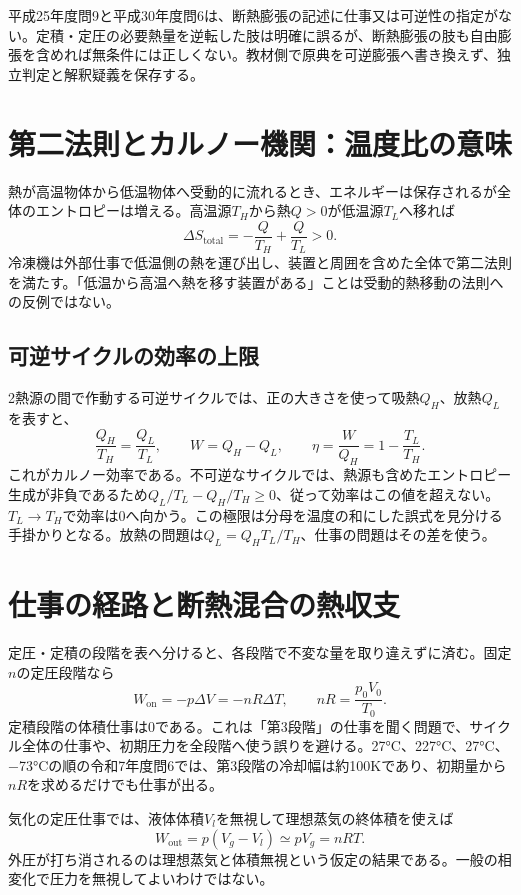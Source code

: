 \begin{tcolorbox}[title=原典の限定不足を保持する]
平成25年度問9と平成30年度問6は、断熱膨張の記述に仕事又は可逆性の指定がない。定積・定圧の必要熱量を逆転した肢は明確に誤るが、断熱膨張の肢も自由膨張を含めれば無条件には正しくない。教材側で原典を可逆膨張へ書き換えず、独立判定と解釈疑義を保存する。
\end{tcolorbox}

\section{第二法則とカルノー機関：温度比の意味}
\label{theory:thermo:entropy}
熱が高温物体から低温物体へ受動的に流れるとき、エネルギーは保存されるが全体のエントロピーは増える。高温源$T_H$から熱$Q>0$が低温源$T_L$へ移れば
\[
 \Delta S_{\mathrm{total}}=-\frac{Q}{T_H}+\frac{Q}{T_L}>0.
\]
冷凍機は外部仕事で低温側の熱を運び出し、装置と周囲を含めた全体で第二法則を満たす。「低温から高温へ熱を移す装置がある」ことは受動的熱移動の法則への反例ではない。

\subsection{可逆サイクルの効率の上限}
\label{theory:thermo:carnot}
2熱源の間で作動する可逆サイクルでは、正の大きさを使って吸熱$Q_H$、放熱$Q_L$を表すと、
\[
 \frac{Q_H}{T_H}=\frac{Q_L}{T_L},
 \qquad W=Q_H-Q_L,
 \qquad \eta=\frac{W}{Q_H}=1-\frac{T_L}{T_H}.
\]
これがカルノー効率である。不可逆なサイクルでは、熱源も含めたエントロピー生成が非負であるため$Q_L/T_L-Q_H/T_H\ge0$、従って効率はこの値を超えない。$T_L\to T_H$で効率は0へ向かう。この極限は分母を温度の和にした誤式を見分ける手掛かりとなる。放熱の問題は$Q_L=Q_HT_L/T_H$、仕事の問題はその差を使う。

\section{仕事の経路と断熱混合の熱収支}
\label{theory:thermo:workpaths}
定圧・定積の段階を表へ分けると、各段階で不変な量を取り違えずに済む。固定$n$の定圧段階なら
\[
 W_{\mathrm{on}}=-p\Delta V=-nR\Delta T,
 \qquad nR=\frac{p_0V_0}{T_0}.
\]
定積段階の体積仕事は0である。これは「第3段階」の仕事を聞く問題で、サイクル全体の仕事や、初期圧力を全段階へ使う誤りを避ける。27°C、227°C、27°C、−73°Cの順の令和7年度問6では、第3段階の冷却幅は約100Kであり、初期量から$nR$を求めるだけでも仕事が出る。

気化の定圧仕事では、液体体積$V_l$を無視して理想蒸気の終体積を使えば
\[
 W_{\mathrm{out}}=p(V_g-V_l)\simeq pV_g=nRT.
\]
外圧が打ち消されるのは理想蒸気と体積無視という仮定の結果である。一般の相変化で圧力を無視してよいわけではない。

